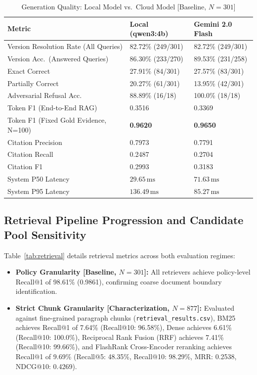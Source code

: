 \documentclass[journal]{IEEEtran}
\newcommand{\ms}{\,\mathrm{ms}}
\begin{document}
\begin{table}[!t]
\caption{Generation Quality: Local Model vs.\ Cloud Model [Baseline, $N=301$]}
\label{tab:generation}
\centering
\scriptsize
\setlength{\tabcolsep}{2.0pt}
\renewcommand{\arraystretch}{0.85}
\begin{tabularx}{\columnwidth}{ZYY}
\toprule
\textbf{Metric} & \textbf{Local (qwen3:4b)} & \textbf{Gemini 2.0 Flash}\\
\midrule
Version Resolution Rate (All Queries) & 82.72\% (249/301) & 82.72\% (249/301)\\
Version Acc.\ (Answered Queries) & 86.30\% (233/270) & 89.53\% (231/258)\\
Exact Correct & 27.91\% (84/301) & 27.57\% (83/301)\\
Partially Correct & 20.27\% (61/301) & 13.95\% (42/301)\\
Adversarial Refusal Acc. & 88.89\% (16/18) & 100.0\% (18/18)\\
Token F1 (End-to-End RAG) & 0.3516 & 0.3369\\
Token F1 (Fixed Gold Evidence, N=100) & \textbf{0.9620} & \textbf{0.9650}\\
Citation Precision & 0.7973 & 0.7791\\
Citation Recall & 0.2487 & 0.2704\\
Citation F1 & 0.2993 & 0.3183\\
System P50 Latency & $29.65\ms$ & $71.63\ms$\\
System P95 Latency & $136.49\ms$ & $85.27\ms$\\
\bottomrule
\end{tabularx}
\end{table}

\subsection{Retrieval Pipeline Progression and Candidate Pool Sensitivity}
Table~\ref{tab:retrieval} details retrieval metrics across both evaluation regimes:
\begin{itemize}\setlength{\itemsep}{0pt}\setlength{\parsep}{0pt}\setlength{\topsep}{0.5pt}
  \item \textbf{Policy Granularity [Baseline, $N=301$]:} All retrievers achieve policy-level Recall@1 of 98.61\% (0.9861), confirming coarse document boundary identification.
  \item \textbf{Strict Chunk Granularity [Characterization, $N=877$]:} Evaluated against fine-grained paragraph chunks (\texttt{retrieval\_results.csv}), BM25 achieves Recall@1 of 7.64\% (Recall@10: 96.58\%), Dense achieves 6.61\% (Recall@10: 100.0\%), Reciprocal Rank Fusion (RRF) achieves 7.41\% (Recall@10: 99.66\%), and FlashRank Cross-Encoder reranking achieves Recall@1 of 9.69\% (Recall@5: 48.35\%, Recall@10: 98.29\%, MRR: 0.2538, NDCG@10: 0.4269).
\end{itemize}
\end{document}
